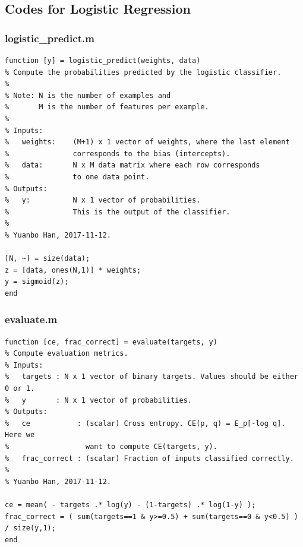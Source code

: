 \documentclass{article}
\begin{document}
\subsection{Codes for Logistic Regression}
\subsubsection{logistic\_predict.m}
\begin{lstlisting}
function [y] = logistic_predict(weights, data)
% Compute the probabilities predicted by the logistic classifier.
%
% Note: N is the number of examples and
%       M is the number of features per example.
%
% Inputs:
%   weights:    (M+1) x 1 vector of weights, where the last element
%               corresponds to the bias (intercepts).
%   data:       N x M data matrix where each row corresponds
%               to one data point.
% Outputs:
%   y:          N x 1 vector of probabilities.
%               This is the output of the classifier.
%
% Yuanbo Han, 2017-11-12.

[N, ~] = size(data);
z = [data, ones(N,1)] * weights;
y = sigmoid(z);
end
\end{lstlisting}

\subsubsection{evaluate.m}
\begin{lstlisting}
function [ce, frac_correct] = evaluate(targets, y)
% Compute evaluation metrics.
% Inputs:
%   targets : N x 1 vector of binary targets. Values should be either 0 or 1.
%   y       : N x 1 vector of probabilities.
% Outputs:
%   ce           : (scalar) Cross entropy. CE(p, q) = E_p[-log q]. Here we
%                  want to compute CE(targets, y).
%   frac_correct : (scalar) Fraction of inputs classified correctly.
%
% Yuanbo Han, 2017-11-12.

ce = mean( - targets .* log(y) - (1-targets) .* log(1-y) );
frac_correct = ( sum(targets==1 & y>=0.5) + sum(targets==0 & y<0.5) ) / size(y,1);
end
\end{lstlisting}
\end{document}
